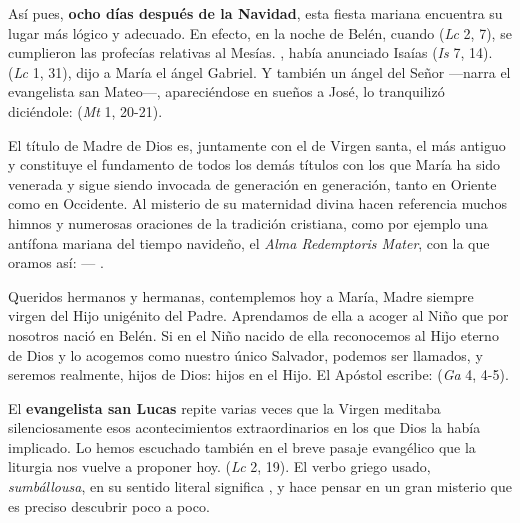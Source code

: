 \begin{body}
	Así pues, \textbf{ocho días después de la Navidad}, esta fiesta mariana encuentra su lugar más lógico y adecuado. En efecto, en la noche de Belén, cuando  (\emph{Lc} 2, 7), se cumplieron las profecías relativas al Mesías. , había anunciado Isaías (\emph{Is} 7, 14).  (\emph{Lc} 1, 31), dijo a María el ángel Gabriel. Y también un ángel del Señor ---narra el evangelista san Mateo---, apareciéndose en sueños a José, lo tranquilizó diciéndole:  (\emph{Mt} 1, 20-21).
	
	El título de Madre de Dios es, juntamente con el de Virgen santa, el más antiguo y constituye el fundamento de todos los demás títulos con los que María ha sido venerada y sigue siendo invocada de generación en generación, tanto en Oriente como en Occidente. Al misterio de su maternidad divina hacen referencia muchos himnos y numerosas oraciones de la tradición cristiana, como por ejemplo una antífona mariana del tiempo navideño, el \emph{Alma Redemptoris Mater}, con la que oramos así:  --- .
	
	Queridos hermanos y hermanas, contemplemos hoy a María, Madre siempre virgen del Hijo unigénito del Padre. Aprendamos de ella a acoger al Niño que por nosotros nació en Belén. Si en el Niño nacido de ella reconocemos al Hijo eterno de Dios y lo acogemos como nuestro único Salvador, podemos ser llamados, y seremos realmente, hijos de Dios: hijos en el Hijo. El Apóstol escribe:  (\emph{Ga} 4, 4-5).
	
	El \textbf{evangelista san Lucas} repite varias veces que la Virgen meditaba silenciosamente esos acontecimientos extraordinarios en los que Dios la había implicado. Lo hemos escuchado también en el breve pasaje evangélico que la liturgia nos vuelve a proponer hoy.  (\emph{Lc} 2, 19). El verbo griego usado, \emph{sumbállousa}, en su sentido literal significa , y hace pensar en un gran misterio que es preciso descubrir poco a poco.
	

\end{body}

